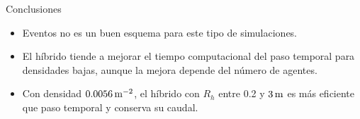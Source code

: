 \documentclass[aspectratio=169]{beamer}
\begin{document}
\begin{frame}{Conclusiones}
  \begin{itemize}\setlength{\itemsep}{1.2em}
    \item Eventos no es un buen esquema para este tipo de simulaciones.
    \item El híbrido tiende a mejorar el tiempo computacional del paso temporal para densidades
      bajas, aunque la mejora depende del número de agentes.
    \item Con densidad $0.0056\,\mathrm{m^{-2}}$, el híbrido con $R_h$ entre 0.2 y $3\,\mathrm{m}$ es más
      eficiente que paso temporal y conserva su caudal.
  \end{itemize}
\end{frame}
\end{document}
